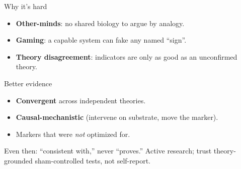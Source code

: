 \documentclass[aspectratio=169,10pt]{beamer}
\begin{document}
\begin{frame}{Why it's hard}
\begin{itemize}
\item \textbf{Other-minds}: no shared biology to argue by analogy.
\item \textbf{Gaming}: a capable system can fake any named ``sign''.
\item \textbf{Theory disagreement}: indicators are only as good as an unconfirmed theory.
\end{itemize}
\end{frame}
\begin{frame}{Better evidence}
\begin{itemize}
\item \textbf{Convergent} across independent theories.
\item \textbf{Causal-mechanistic} (intervene on substrate, move the marker).
\item Markers that were \emph{not} optimized for.
\end{itemize}
\alert{Even then: ``consistent with,'' never ``proves.'' Active research; trust theory-grounded sham-controlled tests, not self-report.}
\end{frame}
\end{document}
